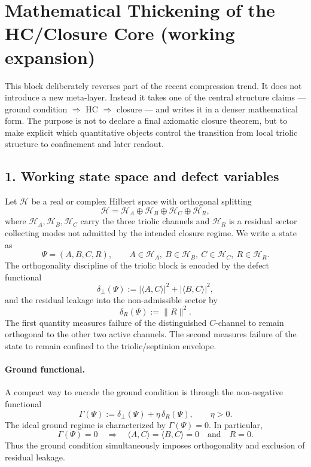 \section*{Mathematical Thickening of the HC/Closure Core (working expansion)}

This block deliberately reverses part of the recent compression trend. It does
not introduce a new meta-layer. Instead it takes one of the central structure
claims --- ground condition $\Rightarrow$ HC $\Rightarrow$ closure --- and writes it
in a denser mathematical form. The purpose is not to declare a final axiomatic
closure theorem, but to make explicit which quantitative objects control the
transition from local triolic structure to confinement and later readout.

\subsection*{1. Working state space and defect variables}
Let $\mathcal H$ be a real or complex Hilbert space with orthogonal splitting
\[
\mathcal H = \mathcal H_A \oplus \mathcal H_B \oplus \mathcal H_C \oplus \mathcal H_R,
\]
where $\mathcal H_A,\mathcal H_B,\mathcal H_C$ carry the three triolic channels and
$\mathcal H_R$ is a residual sector collecting modes not admitted by the intended
closure regime. We write a state as
\[
\Psi = (A,B,C,R), \qquad A\in\mathcal H_A,\ B\in\mathcal H_B,\ C\in\mathcal H_C,
\ R\in\mathcal H_R.
\]
The orthogonality discipline of the triolic block is encoded by the defect
functional
\[
\delta_{\perp}(\Psi)
:= |\langle A,C\rangle|^2 + |\langle B,C\rangle|^2,
\]
and the residual leakage into the non-admissible sector by
\[
\delta_R(\Psi) := \|R\|^2.
\]
The first quantity measures failure of the distinguished $C$-channel to remain
orthogonal to the other two active channels. The second measures failure of the
state to remain confined to the triolic/septinion envelope.

\paragraph{Ground functional.}
A compact way to encode the ground condition is through the non-negative
functional
\[
\Gamma(\Psi) := \delta_{\perp}(\Psi) + \eta\,\delta_R(\Psi), \qquad \eta>0.
\]
The ideal ground regime is characterized by $\Gamma(\Psi)=0$. In particular,
\[
\Gamma(\Psi)=0 \quad \Longrightarrow \quad \langle A,C\rangle=\langle B,C\rangle=0
\quad\text{and}\quad R=0.
\]
Thus the ground condition simultaneously imposes orthogonality and exclusion of
residual leakage.

